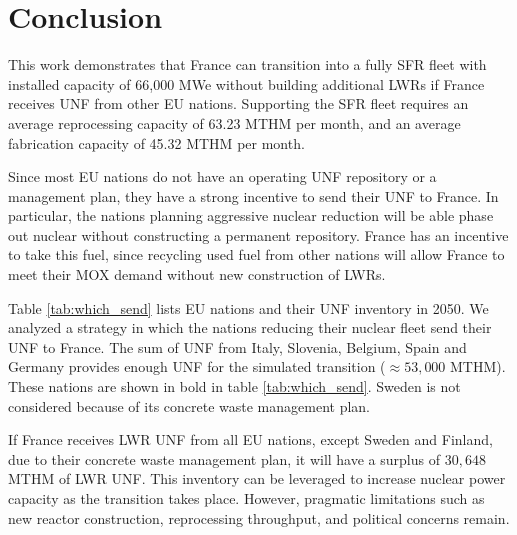 \section{Conclusion}

This work demonstrates that France can transition into
a fully \gls{SFR} fleet with installed capacity of 66,000 \gls{MWe} without
building additional \glspl{LWR}
if France receives \gls{UNF} from other \gls{EU} nations.
Supporting the \gls{SFR} fleet requires an average 
reprocessing capacity of 63.23 \gls{MTHM} per month,
and an average fabrication capacity of 45.32 \gls{MTHM} per month.

Since most \gls{EU} nations do not have an operating \gls{UNF}
repository or a management plan, they have a strong incentive
to send their \gls{UNF} to France. In particular, the nations
planning aggressive nuclear reduction will be able phase out nuclear
without constructing a permanent repository. France has an
incentive to take this fuel, since recycling used fuel from
other nations will allow France to meet their MOX demand
without new construction of \glspl{LWR}.

Table \ref{tab:which_send} lists \gls{EU} nations and their \gls{UNF} inventory
in 2050. We analyzed a strategy in which 
the nations reducing their nuclear fleet send their \gls{UNF} to France.
The sum of \gls{UNF} from Italy, Slovenia, Belgium, Spain and Germany
provides enough \gls{UNF} for the simulated transition ($\approx 53,000$ MTHM). 
These nations are shown in bold in table \ref{tab:which_send}.
Sweden is not considered because of its concrete waste management plan.

If France receives \gls{LWR} \gls{UNF} from all \gls{EU} nations,
except Sweden and Finland, due to their concrete waste management plan,
it will have a surplus of $30,648$ MTHM of \gls{LWR} \gls{UNF}. This
inventory can be leveraged to increase nuclear power capacity as
the transition takes place. However, pragmatic limitations such
as new reactor construction, reprocessing throughput, and
political concerns remain.

